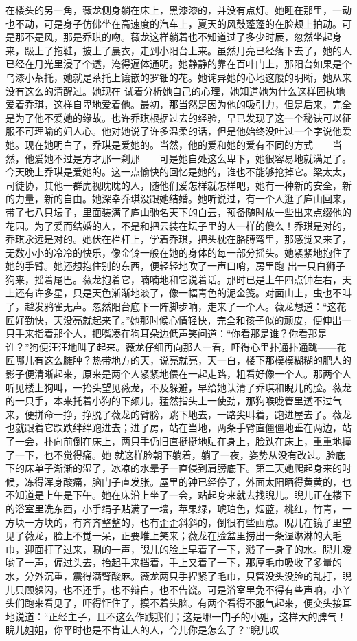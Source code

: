 \documentclass{article}
\begin{document}
在楼头的另一角，薇龙侧身躺在床上，黑漆漆的，并没有点灯。她睡在那里，一动也不动，可是身子仿佛坐在高速度的汽车上，夏天的风鼓蓬蓬的在脸颊上拍动。可是那不是风，那是乔琪的吻。薇龙这样躺着也不知道过了多少时辰，忽然坐起身来，趿上了拖鞋，披上了晨衣，走到小阳台上来。虽然月亮已经落下去了，她的人已经在月光里浸了个透，淹得遍体通明。她静静的靠在百叶门上，那阳台如果是个乌漆小茶托，她就是茶托上镶嵌的罗钿的花。她诧异她的心地这般的明晰，她从来没有这么的清醒过。她现在
\newpage
试着分析她自己的心理，她知道她为什么这样固执地爱着乔琪，这样自卑地爱着他。最初，那当然是因为他的吸引力，但是后来，完全是为了他不爱她的缘故。也许乔琪根据过去的经验，早已发现了这一个秘诀可以征服不可理喻的妇人心。他对她说了许多温柔的话，但是他始终没吐过一个字说他爱她。现在她明白了，乔琪是爱她的。当然，他的爱和她的爱有不同的方式——当然，他爱她不过是方才那一刹那——可是她自处这么卑下，她很容易地就满足了。今天晚上乔琪是爱她的。这一点愉快的回忆是她的，谁也不能够抢掉它。梁太太，司徒协，其他一群虎视眈眈的人，随他们爱怎样就怎样吧，她有一种新的安全，新的力量，新的自由。她深幸乔琪没跟她结婚。她听说过，有一个人逛了庐山回来，带了七八只坛子，里面装满了庐山驰名天下的白云，预备随时放一些出来点缀他的花园。为了爱而结婚的人，不是和把云装在坛子里的人一样的傻么！乔琪是对的，乔琪永远是对的。她伏在栏杆上，学着乔琪，把头枕在胳膊弯里，那感觉又来了，无数小小的冷冷的快乐，像金铃一般在她的身体的每一部分摇头。她紧紧地抱住了她的手臂。她还想抱住别的东西，便轻轻地吹了一声口哨，房里跑
\newpage
出一只白狮子狗来，摇着尾巴。薇龙抱着它，喃喃地和它说着话。那时已是上午四点钟左右，天上还有许多星，只是天色渐渐地淡了，像一幅青色的泥金笺。对面山上，虫也不叫了，越发鸦雀无声。忽然阳台底下一阵脚步响，走来了一个人。薇龙想道：“这花匠好勤快，天没亮就起来了。”她那时候心情轻快，完全和孩子似的顽皮，便伸出一只手来指着那个人，把嘴凑在狗耳朵边低声笑问道：“你看那是谁？你看那是谁？”狗便汪汪地叫了起来。薇龙仔细再向那人一看，吓得心里扑通扑通跳——花匠哪儿有这么臃肿？热带地方的天，说亮就亮，天一白，楼下那模模糊糊的肥人的影子便清晰起来，原来是两个人紧紧地偎在一起走路，粗看好像一个人。那两个人听见楼上狗叫，一抬头望见薇龙，不及躲避，早给她认清了乔琪和睨儿的脸。薇龙的一只手，本来托着小狗的下颏儿，猛然指头上一使劲，那狗喉咙管里透不过气来，便拼命一挣，挣脱了薇龙的臂膀，跳下地去，一路尖叫着，跑进屋去了。薇龙也就跟着它跌跌绊绊跑进去；进了房，站在当地，两条手臂直僵僵地垂在两边，站了一会，扑向前倒在床上，两只手仍旧直挺挺地贴在身上，脸跌在床上，重重地撞了一下，也不觉得痛。她
\newpage
就这样脸朝下躺着，躺了一夜，姿势从没有改过。脸底下的床单子渐渐的湿了，冰凉的水晕子一直侵到肩膀底下。第二天她爬起身来的时候，冻得浑身酸痛，脑门子直发胀。屋里的钟已经停了，外面太阳晒得黄黄的，也不知道是上午是下午。她在床沿上坐了一会，站起身来就去找睨儿。睨儿正在楼下的浴室里洗东西，小手绢子贴满了一墙，苹果绿，琥珀色，烟蓝，桃红，竹青，一方块一方块的，有齐齐整整的，也有歪歪斜斜的，倒很有些画意。睨儿在镜子里望见了薇龙，脸上不觉一呆，正要堆上笑来；薇龙在脸盆里捞出一条湿淋淋的大毛巾，迎面打了过来，唰的一声，睨儿的脸上早着了一下，溅了一身子的水。睨儿嗳哟了一声，偏过头去，抬起手来挡着，手上又着了一下，那厚毛巾吸收了多量的水，分外沉重，震得满臂酸麻。薇龙两只手捏紧了毛巾，只管没头没脸的乱打，睨儿只顾躲闪，也不还手，也不辩白，也不告饶。可是浴室里免不得有些声响，小丫头们跑来看见了，吓得怔住了，摸不着头脑。有两个看得不服气起来，便交头接耳地说道：“正经主子，且不这么作践我们；这是哪一门子的小姐，这样大的脾气！睨儿姐姐，你平时也是不肯让人的人，今儿你是怎么了？”睨儿叹
\end{document}
